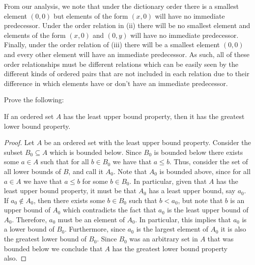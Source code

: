 \documentclass[12pt]{article}
\begin{document}
From our analysis, we note that under the dictionary order there is a smallest element $(0,0)$
but elements of the form $(x, 0)$ will have no immediate predecessor. Under the order relation
in (ii) there will be no smallest element and elements of the form $(x, 0)$ and $(0, y)$ will
have no immediate predecessor. Finally, under the order relation of (iii) there will be a smallest element
$(0,0)$ and every other element will have an immediate predecessor. As such, all of these order
relationships must be different relations which can be easily seen by the different kinds of 
ordered pairs that are not included in each relation due to their difference in which elements
have or don't have an immediate predecessor. 

 Prove the following:
\begin{theorem}
	If an ordered set $A$ has the least upper bound property, then it has the 
	greatest lower bound property.
\end{theorem}

\begin{proof}
	Let $A$ be an ordered set with the least upper bound property. Consider the subset
	$B_0 \subseteq A$ which is bounded below. Since $B_0$ is bounded below there exists
	some $a \in A$ such that for all $b \in B_0$ we have that $a \leq b$. Thus, consider 
	the set of all lower bounds of $B$, and call it $A_0$. Note that $A_0$ is bounded
	above, since for all $a \in A$ we have that $a \leq b$ for some $b \in B_0$.
	In particular, given that $A$ has the least upper bound property, it must be 
	that $A_0$ has a least upper bound, say $a_0$. If $a_0 \notin A_0$, then 
	there exists some $b \in B_0$ such that $b < a_0$, but note that $b$ is an upper
	bound of $A_0$ which contradicts the fact that $a_0$ is the least upper bound of 
	$A_0$. Therefore, $a_0$ must be an element of $A_0$. In particular, this implies
	that $a_0$ is a lower bound of $B_0$. Furthermore, since $a_0$ is the largest element of 
	$A_0$ it is also the greatest lower bound of $B_0$. Since $B_0$ was an arbitrary 
	set in $A$ that was bounded below we conclude that $A$ has the greatest lower bound property
	also.
\end{proof}
\end{document}
